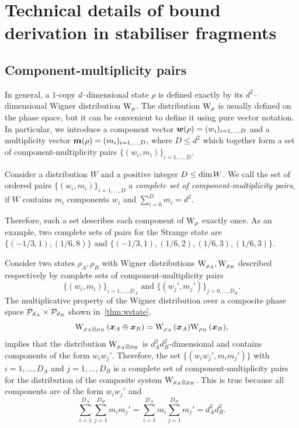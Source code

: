 
\section{Technical details of bound derivation in stabiliser fragments}
\label{app:lcst_technical}

\subsection{Component-multiplicity pairs}
\label{app:cmpairs}
In general, a $1$-copy $d$--dimensional state $\rho$ is defined exactly by its $d^2$--dimensional Wigner distribution $\W{\rho}$. 
The distribution $\W{\rho}$ is usually defined on the phase space, but it can be convenient to define it using pure vector notation. 
In particular, we introduce a component vector $\bmw(\rho) = (w_i)_{i=1,\dots,D}$ and a multiplicity vector $\bmm(\rho) = (m_i)_{i=1,\dots,D}$, where $D \leq d^2$ which together form a set of component-multiplicity pairs $\{(w_i, m_i)\}_{i=1,\dots,D}$.
\begin{definition}
	Consider a distribution $W$ and a positive integer $D \leq {\rm{dim}}\hspace{1pt}W$. 
	We call the set of ordered pairs $\{(w_i, m_i)\}_{i=1,\dots,D}$ a \emph{complete set of component-multiplicity pairs}, if $W$ contains $m_i$ components $w_i$ and $\sum_{i=0}^D m_i = d^2$.
\end{definition}
Therefore, such a set describes each component of $\W{\rho}$ exactly once.
As an example, two complete sets of pairs for the Strange state are $\{( -1/3, 1), ( 1/6, 8)\}$ and $\{(-1/3, 1), (1/6, 2), (1/6, 3), (1/6, 3)\}$.

Consider two states $\rho_A, \rho_B$ with Wigner distributions $\W{\rho_A}, \W{\rho_B}$ described respectively by complete sets of component-multiplicity pairs 
\begin{equation}
	\{(w_i, m_i)\}_{i=1,\dots,D_A} \text{ and } \{(w_j', m_j')\}_{j=0,\dots,D_B}.
\end{equation}
The multiplicative property of the Wigner distribution over a composite phase space $\cal{P}_{d_A} \times \cal{P}_{d_B}$ shown in~\cref{thm:wstate},
\begin{equation}
	\W[\bmx_A \oplus \bmx_B]{\rho_A \otimes \rho_B} = \W[\bmx_A]{\rho_A}\W[\bmx_B]{\rho_B},
\end{equation}
implies that the distribution $\W{\rho_A \otimes \rho_B}$ is $d_A^2 d_B^2$-dimensional and contains components of the form $w_i w_j'$. 
Therefore, the set $\{(w_i w_j', m_i m_j')\}$ with $i=1,\dots,D_A$ and $j=1,\dots,D_B$ is a complete set of component-multiplicity pairs for the distribution of the composite system $\W{\rho_A \otimes \rho_B}$.
This is true because all components are of the form $w_i w_j'$ and 
\begin{equation*}
	\sum_{i=1}^{D_A}\sum_{j=1}^{D_B} m_i m_j' = \sum_{i=1}^{D_A} m_i \sum_{j=1}^{D_B} m_j' = d_A^2 d_B^2.
\end{equation*}

